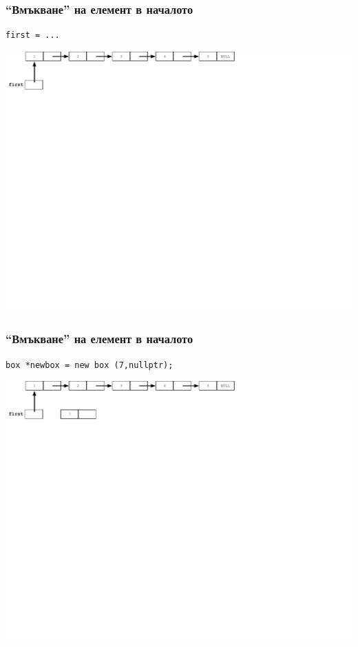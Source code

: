 \documentclass{beamer}
\begin{document}
\begin{frame}[fragile]
\frametitle{``Вмъкване'' на елемент в началото}

\begin{flushleft}
\begin{lstlisting}
first = ...
\end{lstlisting}  
\end{flushleft}


\includegraphics[width=14.0cm]{images/02_ll_flatchain}

\end{frame}


\begin{frame}[fragile]
\frametitle{``Вмъкване'' на елемент в началото}

\begin{flushleft}
\begin{lstlisting}
box *newbox = new box (7,nullptr);
\end{lstlisting}  
\end{flushleft}


\includegraphics[width=14.0cm]{images/03_ll_push_initial}

\end{frame}
\end{document}
